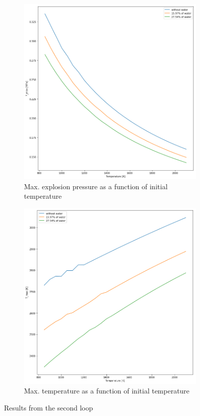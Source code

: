 \documentclass[a4paper]{article}
\begin{document}
\begin{figure}[H]
    \centering
    \begin{subfigure}[h]{0.4\textwidth}
        \includegraphics[width=\textwidth]{2_Pmax_to_T.png}
        	\caption{Max. explosion pressure as a function of initial temperature}
        \label{fig:2_1}
    \end{subfigure}
    \qquad
    \begin{subfigure}[h]{0.4\textwidth}
        \includegraphics[width=\textwidth]{2_Tmax_to_T.png}
        	\caption{Max. temperature as a function of initial temperature}
        \label{fig:2_2}
    \end{subfigure}
    \caption{Results from the second loop}\label{fig:2}
\end{figure}
\end{document}
